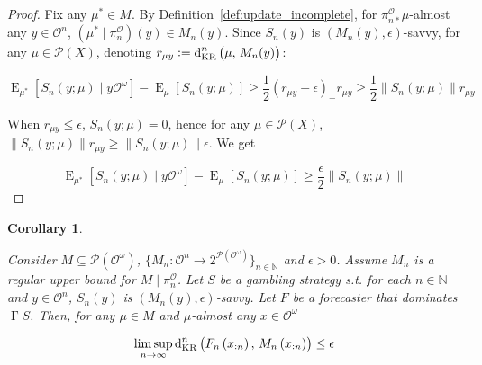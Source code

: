 \documentclass[11pt]{article}
\theoremstyle{definition}
\theoremstyle{plain}
\newtheorem{corollary}{Corollary}%
\newcommand{\Nats}{\mathbb{N}}
\newcommand{\N}[1]{\lVert #1 \rVert}
\newcommand{\Sq}[2]{\{#1\}_{#2 \in \Nats}}
\newcommand{\Sqn}[1]{\Sq{#1}{n}}
\DeclareMathOperator{\E}{E}
\newcommand{\PM}{\mathcal{P}}
\newcommand{\DKR}{\operatorname{d}_{\textnormal{KR}}}
\newcommand{\Ob}{\mathcal{O}}
\newcommand{\OO}{\Ob^\omega}
\newcommand{\PO}{\pi^\Ob}
\newcommand{\PMO}{\PM(\OO)}
\DeclareMathOperator{\PG}{\Gamma}
\begin{document}
\begin{proof}

Fix any $\mu^* \in M$. By Definition~\ref{def:update_incomplete}, for $\PO_{n*}\mu$-almost any $y\in\Ob^n$, ${\left(\mu^* \mid \PO_n\right)\left(y\right) \in M_n(y)}$. Since $S_n\left(y\right)$ is $\left(M_n(y),\epsilon\right)$-savvy, for any $\mu \in \PM\left(X\right)$, denoting $r_{\mu y}:=\DKR^n\left(\mu,\,M_n(y)\right)$:

$$\E_{\mu^*}\left[S_n\left(y;\mu\right) \mid y\OO\right] - \E_{\mu}\left[S_n\left(y;\mu\right)\right] \geq \frac{1}{2} \left(r_{\mu y} - \epsilon\right)_+ r_{\mu y} \geq \frac{1}{2} \N{S_n\left(y;\mu\right)} r_{\mu y}$$

When $r_{\mu y} \leq \epsilon$, $S_n\left(y;\mu\right) = 0$, hence for any $\mu \in \PM\left(X\right)$, $\N{S_n\left(y;\mu\right)} r_{\mu y} \geq \N{S_n\left(y;\mu\right)} \epsilon$. We get

$$\E_{\mu^*}\left[S_n\left(y;\mu\right) \mid y\OO\right] - \E_{\mu}\left[S_n\left(y;\mu\right)\right] \geq \frac{\epsilon}{2} \N{S_n\left(y;\mu\right)}$$
\end{proof}

\begin{samepage}
\begin{corollary}
\label{crl:vicinity_convergence}

Consider $M \subseteq \PMO$, $\Sqn{M_n : \Ob^n \rightarrow 2^{\PMO}}$ and $\epsilon > 0$. Assume $M_n$ is a regular upper bound for $M \mid \PO_n$. Let $S$ be a gambling strategy s.t. for each $n \in \Nats$ and $y \in \Ob^n$, $S_n\left(y\right)$ is $\left(M_n(y),\epsilon\right)$-savvy. Let $F$ be a forecaster that dominates $\PG{S}$. Then, for any $\mu \in M$ and $\mu$-almost any $x \in \OO$

\begin{equation}
\limsup_{n \rightarrow \infty} \DKR^n\left(F_n\left(x_{:n}\right),\, M_n\left(x_{:n}\right)\right) \leq \epsilon
\end{equation}

\end{corollary}
\end{samepage}
\end{document}

